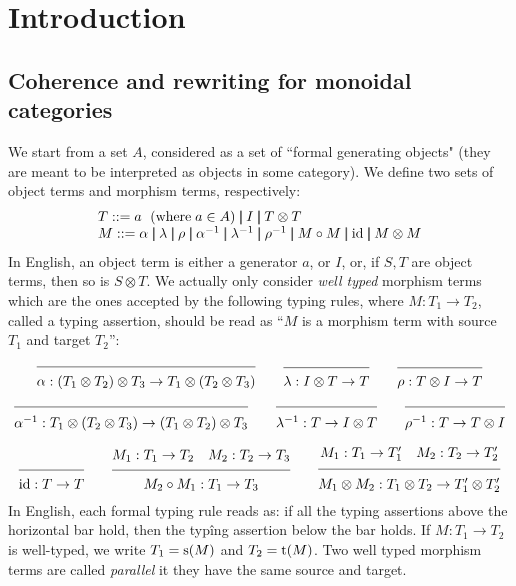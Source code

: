 
\section{Introduction} 
\label{s:introduction}






\subsection{Coherence and rewriting for monoidal categories}
We start from a set $A$, considered as a set of  ``formal generating objects"  (they are meant to be interpreted as objects in some category).  We define two sets   of object terms and morphism terms, respectively:
$$\begin{array}{l}
T::= a\  \;(\mbox{where}\;a\in A) \Alt I \Alt T\otimes T\\
M ::= \alpha \Alt \lambda \Alt\rho\Alt  \alpha^{-1} \Alt \lambda^{-1} \Alt\rho^{-1} \Alt M\comp M\Alt \id\Alt M\otimes M
\end{array}$$
In English, an object term is either a generator $a$, or $I$, or, if $S,T$ are object terms, then so is $S\otimes T$.
We actually only consider {\em well typed} morphism terms  which are the ones accepted by the following typing rules, where $M:T_1\rightarrow T_2$, called a typing assertion, should be read as ``$M$ is a morphism term with source $T_1$ and target $T_2$'':
$$\seq{}{\alpha:(T_1\otimes T_2)\otimes T_3\rightarrow T_1\otimes(T_2\otimes T_3)}\quad\quad
\seq{}{\lambda:I\otimes T\rightarrow T}\quad\quad\seq{}{\rho:T\otimes I\rightarrow T}$$
$$\seq{}{\alpha^{-1}:T_1\otimes(T_2\otimes T_3)\rightarrow (T_1\otimes T_2)\otimes T_3}\quad\quad
\seq{}{\lambda^{-1}: T\rightarrow I\otimes T}\quad\quad\seq{}{\rho^{-1}:T\rightarrow T\otimes I}$$

$$\seq{}{\id:T\rightarrow T}\quad\quad \seq{M_1:T_1\rightarrow T_2\quad M_2:T_2\rightarrow T_3}{M_2\comp M_1:T_1\rightarrow T_3}\quad\quad \seq{M_1:T_1\rightarrow T'_1\quad M_2:T_2\rightarrow T'_2}{M_1\otimes M_2:T_1\otimes T_2\rightarrow T'_1\otimes T'_2}$$
In English, each formal typing rule reads as: if all the typing assertions above the horizontal bar hold, then the typîng assertion below the bar holds.  If $M:T_1\rightarrow T_2$ is well-typed, we write $T_1={\text s}(M)$ and $T_2={\text t}(M)$. Two well typed morphism terms are called {\em parallel} it they have the same source and target.

